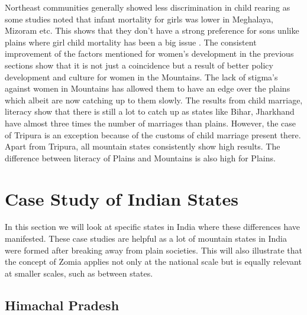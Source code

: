 Northeast communities generally showed less discrimination in child rearing as some studies noted that infant mortality for girls was lower in Meghalaya, Mizoram etc. This shows that they don't have a strong preference for sons unlike plains where girl child mortality has been a big issue \citep{mahanta2013gender}. The  consistent improvement of the factors mentioned for women's development in the previous sections show that it is not just a coincidence but a result of better policy development and culture for women in the Mountains. The lack of stigma's against women in Mountains has allowed them to have an edge over the plains which albeit are now catching up to them slowly. The results from child marriage, literacy show that there is still a lot to catch up as states like Bihar, Jharkhand have almost three times the number of marriages than plains. However, the case of Tripura is an exception because of the customs of child marriage present there. Apart from Tripura, all mountain states consistently show high results. The difference between literacy of Plains and Mountains is also high for Plains.

\section{Case Study of Indian States}
In this section we will look at specific states in India where these differences have manifested. These case studies are helpful as a lot of mountain states in India were formed after breaking away from plain societies. This will also illustrate that the concept of Zomia applies not only at the national scale but is equally relevant at smaller scales, such as between states.

\subsection{Himachal Pradesh}

